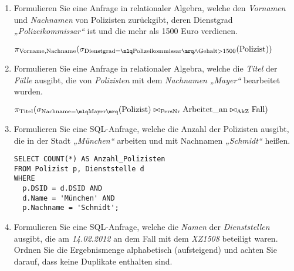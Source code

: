 \documentclass{lehramt-informatik-minimal}
\begin{document}
\begin{enumerate}


\item Formulieren Sie eine Anfrage in relationaler
Algebra, welche den \emph{Vornamen} und
\emph{Nachnamen} von Polizisten zurückgibt, deren Dienstgrad
\emph{„Polizeikommissar“} ist und die mehr als 1500 Euro verdienen.

\begin{antwort}
$\pi_{\text{Vorname,Nachname}}(
  \sigma_{
    \text{Dienstgrad} = \mlq \text{Polizeikommissar} \mrq
      \land
    \text{Gehalt} > 1500
  }(\text{Polizist})
)$
\end{antwort}


\item Formulieren Sie eine Anfrage in relationaler Algebra, welche die
\emph{Titel} der \emph{Fälle} ausgibt, die von \emph{Polizisten} mit dem
\emph{Nachnamen} \emph{„Mayer“} bearbeitet wurden.

\begin{antwort}
$
\pi_{\text{Titel}}(
  \sigma_{\text{Nachname} = \mlq \text{Mayer} \mrq}(\text{Polizist})
  \bowtie_{\text{PersNr}}
  \text{Arbeitet\_an}
  \bowtie_{\text{AkZ}}
  \text{Fall}
)
$
\end{antwort}


\item Formulieren Sie eine SQL-Anfrage, welche die Anzahl der
Polizisten ausgibt, die in der Stadt \emph{„München“} arbeiten und mit
Nachnamen \emph{„Schmidt“} heißen.

\begin{antwort}
\begin{verbatim}
SELECT COUNT(*) AS Anzahl_Polizisten
FROM Polizist p, Dienststelle d
WHERE
  p.DSID = d.DSID AND
  d.Name = 'München' AND
  p.Nachname = 'Schmidt';
\end{verbatim}
\end{antwort}


\item Formulieren Sie eine SQL-Anfrage, welche die \emph{Namen} der
\emph{Dienststellen} ausgibt, die am \emph{14.02.2012} an dem Fall mit
dem \emph{XZ1508} beteiligt waren. Ordnen Sie die Ergebnismenge
alphabetisch (aufsteigend) und achten Sie darauf, dass keine Duplikate
enthalten sind.


\end{enumerate}
\end{document}
